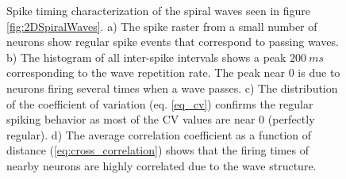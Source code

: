 \begin{figure}[!htb]
 \caption{Spike timing characterization of the spiral waves seen in figure \ref{fig:2DSpiralWaves}.
          a) The spike raster from a small number of neurons show regular spike events that correspond to passing waves.
          b) The histogram of all inter-spike intervals shows a peak $200~ms$ corresponding to the wave repetition rate. The peak near 0 is due to neurons firing several times when a wave passes. 
          c) The distribution of the coefficient of variation (eq. \ref{eq_cv}) confirms the regular spiking behavior as most of the CV values are near 0 (perfectly regular).
          d) The average correlation coefficient as a function of distance (\ref{eq:cross_correlation}) shows that the firing times of nearby neurons are highly correlated due to the wave structure.
          } 
 \label{fig:2DSpiralWave_SpikeTiming}
\end{figure}
 \FloatBarrier
 

